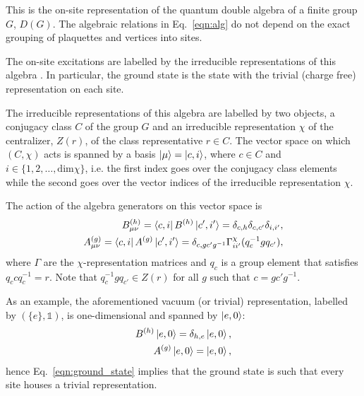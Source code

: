 \documentclass[two column]{article}
\newcommand{\caro}[1]{\textcolor{red}{[#1]}}
\begin{document}
This is the on-site representation of the quantum double algebra of a finite group $G$, $D(G)$. The algebraic relations in Eq.~\eqref{eqn:alg} do not depend on the exact grouping of plaquettes and vertices into sites.

The on-site excitations are labelled by the irreducible representations of this algebra \cite{cui2018topological, Kitaev_2003}. In particular, the ground state is the state with the trivial (charge free) representation on each site. 

The irreducible representations of this algebra are labelled by two objects, a conjugacy class $C$ of the group $G$ and an irreducible representation $\chi$ of the centralizer, $Z(r)$, of the class representative $r \in C$. The vector space on which $(C, \chi)$ acts is spanned by a basis $\ket{\mu} = \ket{c, i}$, where $c \in C$ and $i \in \{1, 2, \ldots, \text{dim}\chi\}$, i.e. the first index goes over the conjugacy class elements while the second goes over the vector indices of the irreducible representation $\chi$.


The action of the algebra generators on this vector space is
\begin{equation}
    \begin{split}
        B^{(h)}_{\mu\nu}=\bra{c, i} B^{(h)} \ket{c', i'} = \delta_{c, h} \delta_{c, c'}\delta_{i, i'}, \\
        A^{(g)}_{\mu\nu} = \bra{c, i} A^{(g)} \ket{c', i'} = \delta_{c,gc'g^{-1}} \Gamma^\chi_{ii'}(q_{c}^{-1}gq_{c'}),
    \end{split}
\end{equation}
where $\Gamma$ are the $\chi$-representation matrices and $q_c$ is a group element that satisfies $q_c c q_c^{-1} = r$. Note that $q_c^{-1}gq_{c'} \in Z(r)$ for all $g$ such that $c = gc'g^{-1}$.

As an example, the aforementioned vacuum (or trivial) representation, labelled by $(\{e\}, \mathbb{1})$, is one-dimensional and spanned by $\ket{e, 0}$:
\begin{equation}
    \begin{split}
        B^{(h)}\ket{e, 0} = \delta_{h,e}\ket{e, 0},\\
        A^{(g)}\ket{e, 0} = \ket{e,0},
    \end{split}
\end{equation}
hence Eq.~\eqref{eqn:ground_state} implies that the ground state is such that every site houses a trivial representation.
\end{document}
